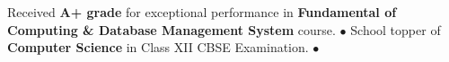 
\begin{cvhonors}
  \cvhonor
    {}
    {\small Received \textbf{A+ grade} for exceptional performance in \textbf {Fundamental of Computing \& Database Management System } course.}
    {}
    {$\bullet$}
  \cvhonor
    {\small }
    {\small School topper of \textbf{Computer Science} in Class XII CBSE Examination.}
    {}
    {$\bullet$}
\end{cvhonors}
